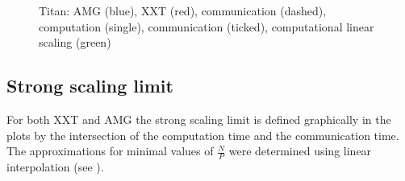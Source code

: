\documentclass{sig-alternate}
\begin{document}
\begin{figure}
{  }
\caption{Titan: AMG ({\color{blue}blue}), XXT ({\color{red}red}), communication (dashed),
  computation (single), communication (ticked), computational linear scaling
  ({\color{green}green})}
\label{fig:scaling_titan}
\end{figure}




\subsection{Strong scaling limit}

For both XXT and
AMG the strong scaling limit is defined graphically in the plots by the
intersection of the computation time
and the communication time. The approximations for minimal values of
$\frac{N}{P}$ were determined using linear interpolation (see
).
\end{document}
